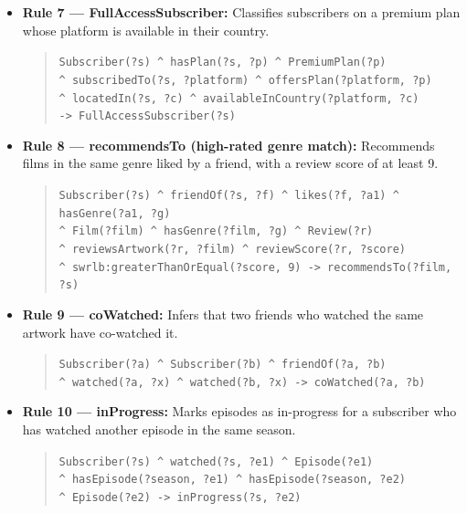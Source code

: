 \begin{itemize}
    \item \textbf{Rule 7 — FullAccessSubscriber:} Classifies subscribers on a premium plan whose platform is available in their country.
    \begin{quote}\small
    \texttt{Subscriber(?s) \^{} hasPlan(?s, ?p) \^{} PremiumPlan(?p)}\\
    \texttt{\^{} subscribedTo(?s, ?platform) \^{} offersPlan(?platform, ?p)}\\
    \texttt{\^{} locatedIn(?s, ?c) \^{} availableInCountry(?platform, ?c)}\\
    \texttt{-> FullAccessSubscriber(?s)}
    \end{quote}

    \item \textbf{Rule 8 — recommendsTo (high-rated genre match):} Recommends films in the same genre liked by a friend, with a review score of at least 9.
    \begin{quote}\small
    \texttt{Subscriber(?s) \^{} friendOf(?s, ?f) \^{} likes(?f, ?a1) \^{} hasGenre(?a1, ?g)}\\
    \texttt{\^{} Film(?film) \^{} hasGenre(?film, ?g) \^{} Review(?r)}\\
    \texttt{\^{} reviewsArtwork(?r, ?film) \^{} reviewScore(?r, ?score)}\\
    \texttt{\^{} swrlb:greaterThanOrEqual(?score, 9) -> recommendsTo(?film, ?s)}
    \end{quote}

    \item \textbf{Rule 9 — coWatched:} Infers that two friends who watched the same artwork have co-watched it.
    \begin{quote}\small
    \texttt{Subscriber(?a) \^{} Subscriber(?b) \^{} friendOf(?a, ?b)}\\
    \texttt{\^{} watched(?a, ?x) \^{} watched(?b, ?x) -> coWatched(?a, ?b)}
    \end{quote}

    \item \textbf{Rule 10 — inProgress:} Marks episodes as in-progress for a subscriber who has watched another episode in the same season.
    \begin{quote}\small
    \texttt{Subscriber(?s) \^{} watched(?s, ?e1) \^{} Episode(?e1)}\\
    \texttt{\^{} hasEpisode(?season, ?e1) \^{} hasEpisode(?season, ?e2)}\\
    \texttt{\^{} Episode(?e2) -> inProgress(?s, ?e2)}
    \end{quote}

\end{itemize}